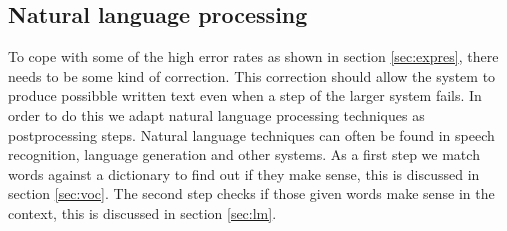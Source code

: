 \documentclass{article}
\begin{document}
\subsection{Natural language processing}
To cope with some of the high error rates as shown in section \ref{sec:expres}, there needs to be some kind of correction. This correction should allow the system to produce possibble written text even when a step of the larger system fails. 
In order to do this we adapt natural language processing techniques as postprocessing steps. Natural language techniques can often be found in speech recognition, language generation and other systems. 
As a first step we match words against a dictionary to find out if they make sense, this is discussed in section \ref{sec:voc}. The second step checks if those given words make sense in the context, this is discussed in section \ref{sec:lm}.
\end{document}

